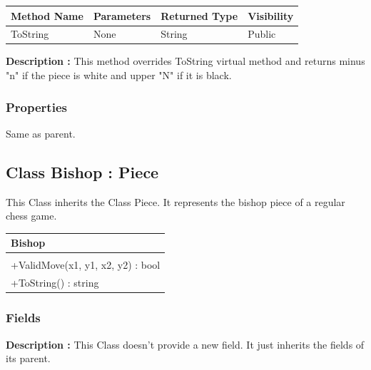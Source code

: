 \documentclass[12pt]{article}
\begin{document}
\begin{table}[H]
    \begin{tabular}{|l|l|l|l|}
    \hline
    \rowcolor[HTML]{EFEFEF} 
    \cellcolor[HTML]{EFEFEF}\textbf{Method Name} & \textbf{Parameters}  & \textbf{Returned Type} & \textbf{Visibility} \\ \hline
    ToString                                   & None                 & String                   & Public              \\ \hline
    \end{tabular}
\end{table}

\textbf{Description :} This method overrides ToString virtual
method and returns minus "n" if the piece is white and upper "N"
if it is black.

\subsubsection{Properties}

Same as parent.

\newpage


\subsection{Class Bishop : Piece}

This Class inherits the Class Piece. It represents the bishop 
piece of a regular chess game.
\begin{table}[H]
    \begin{tabular}{|l|}
    \hline
    \cellcolor[HTML]{C0C0C0}\textbf{Bishop} \\ \hline
    \cellcolor[HTML]{EFEFEF}                    \\ \hline
    +ValidMove(x1, y1, x2, y2) : bool           \\ \hline
    +ToString() : string                        \\ \hline
    \end{tabular}
\end{table}

\subsubsection{Fields}

\textbf{Description :} This Class doesn't provide a new field. It just
inherits the fields of its parent.
\end{document}
